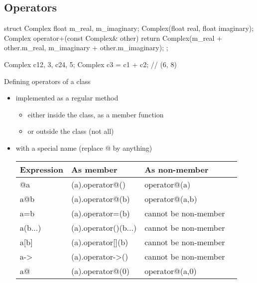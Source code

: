 \subsection[Op]{Operators}

\begin{frame}[fragile]
  \begin{cppcode}
    struct Complex {
      float m_real, m_imaginary;
      Complex(float real, float imaginary);
      Complex operator+(const Complex& other) {
        return Complex(m_real + other.m_real,
                       m_imaginary + other.m_imaginary);
      }
    };

    Complex c1{2, 3}, c2{4, 5};
    Complex c3 = c1 + c2; // (6, 8)
  \end{cppcode}
\end{frame}

\begin{frame}
  \begin{block}{Defining operators of a class}
    \begin{itemize}
    \item implemented as a regular method
      \begin{itemize}
      \item either inside the class, as a member function
      \item or outside the class (not all)
      \end{itemize}
    \item with a special name (replace @ by anything)
      \begin{tabular}{llll}
        Expression & As member & As non-member \\
        \hline
        @a & (a).operator@() & operator@(a) \\
        a@b & (a).operator@(b) & operator@(a,b) \\
        a=b & (a).operator=(b) & cannot be non-member \\
        a(b...) & (a).operator()(b...) & cannot be non-member \\
        a[b] & (a).operator[](b) & cannot be non-member \\
        a-\textgreater & (a).operator-\textgreater() & cannot be non-member \\
        a@ & (a).operator@(0) & operator@(a,0) \\
      \end{tabular}
    \end{itemize}
  \end{block}
\end{frame}

